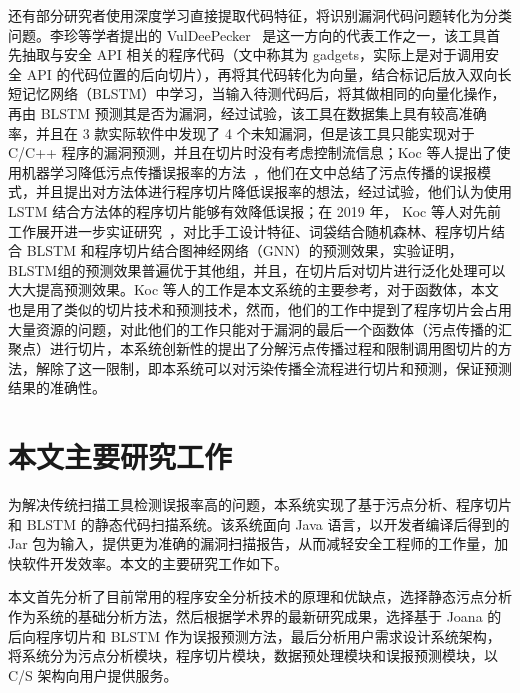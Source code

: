 还有部分研究者使用深度学习直接提取代码特征，将识别漏洞代码问题转化为分类问题。李珍等学者提出的 VulDeePecker~\cite{vuldeepecker} 是这一方向的代表工作之一，该工具首先抽取与安全 API 相关的程序代码（文中称其为 gadgets，实际上是对于调用安全 API 的代码位置的后向切片），再将其代码转化为向量，结合标记后放入双向长短记忆网络（BLSTM）中学习，当输入待测代码后，将其做相同的向量化操作，再由 BLSTM 预测其是否为漏洞，经过试验，该工具在数据集上具有较高准确率，并且在 3 款实际软件中发现了 4 个未知漏洞，但是该工具只能实现对于 C/C++ 程序的漏洞预测，并且在切片时没有考虑控制流信息；Koc 等人提出了使用机器学习降低污点传播误报率的方法~\cite{Koc2017}，他们在文中总结了污点传播的误报模式，并且提出对方法体进行程序切片降低误报率的想法，经过试验，他们认为使用 LSTM 结合方法体的程序切片能够有效降低误报；在 2019 年， Koc 等人对先前工作展开进一步实证研究~\cite{Koc2019}，对比手工设计特征、词袋结合随机森林、程序切片结合 BLSTM 和程序切片结合图神经网络（GNN）的预测效果，实验证明，BLSTM组的预测效果普遍优于其他组，并且，在切片后对切片进行泛化处理可以大大提高预测效果。Koc 等人的工作是本文系统的主要参考，对于函数体，本文也是用了类似的切片技术和预测技术，然而，他们的工作中提到了程序切片会占用大量资源的问题，对此他们的工作只能对于漏洞的最后一个函数体（污点传播的汇聚点）进行切片，本系统创新性的提出了分解污点传播过程和限制调用图切片的方法，解除了这一限制，即本系统可以对污染传播全流程进行切片和预测，保证预测结果的准确性。



\section{本文主要研究工作}
为解决传统扫描工具检测误报率高的问题，本系统实现了基于污点分析、程序切片和 BLSTM 的静态代码扫描系统。该系统面向 Java 语言，以开发者编译后得到的 Jar 包为输入，提供更为准确的漏洞扫描报告，从而减轻安全工程师的工作量，加快软件开发效率。本文的主要研究工作如下。

本文首先分析了目前常用的程序安全分析技术的原理和优缺点，选择静态污点分析作为系统的基础分析方法，然后根据学术界的最新研究成果，选择基于 Joana 的后向程序切片和 BLSTM 作为误报预测方法，最后分析用户需求设计系统架构，将系统分为污点分析模块，程序切片模块，数据预处理模块和误报预测模块，以 C/S 架构向用户提供服务。

